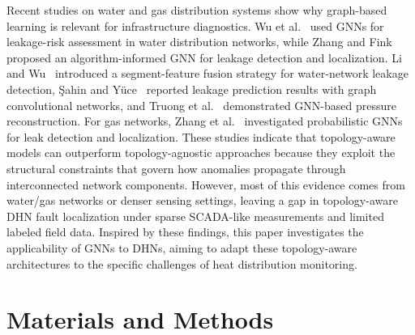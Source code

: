 \documentclass[energies,article,submit,pdftex,moreauthors]{Definitions/mdpi}
\newif\ifshowrevisions
\newcommand{\revisionstyle}[1]{\textcolor{blue}{#1}}
\newcommand{\revision}[1]{\ifshowrevisions\revisionstyle{#1}\else#1\fi}
\begin{document}
Recent studies on water and gas distribution systems show why
	graph-based learning is relevant for infrastructure diagnostics. Wu et
	al.~\cite{wu2024feel} used GNNs for leakage-risk assessment in water
	distribution networks, while Zhang and Fink~\cite{zhang2025algorithm}
	proposed an algorithm-informed GNN for leakage detection and localization.
	Li and Wu~\cite{li2024convolutional} introduced a segment-feature fusion
	strategy for water-network leakage detection, \c{S}ahin and
	Y{\"u}ce~\cite{csahin2023prediction} reported leakage prediction results with
	graph convolutional networks, and Truong et al.~\cite{truong2024graph}
	demonstrated GNN-based pressure reconstruction. For gas networks, Zhang et
	al.~\cite{zhang2023towards} investigated probabilistic GNNs for leak
	detection and localization. These studies indicate that topology-aware models
	can outperform topology-agnostic approaches because they exploit the
	structural constraints that govern how anomalies propagate through
	interconnected network components. However, most of this evidence comes from
	water/gas networks or denser sensing settings, leaving a gap in
	topology-aware DHN fault localization under sparse SCADA-like measurements and
	limited labeled field data. Inspired by these findings, this paper
	investigates the applicability of GNNs to DHNs, aiming to adapt these
	topology-aware architectures to the specific challenges of heat distribution
	monitoring.

\section{Materials and Methods}


\end{document}
